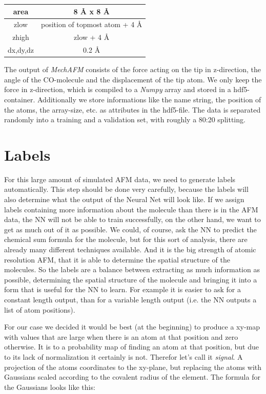 \documentclass{article}
\begin{document}
\begin{center}
\begin{tabular}{|c|c|}
\hline area & 8 {\AA} x 8 {\AA} \\ 
\hline zlow & position of topmost atom + 4 {\AA} \\ 
\hline zhigh & zlow + 4 {\AA} \\ 
\hline dx,dy,dz & 0.2 {\AA} \\ 
\hline 
\end{tabular} 
\end{center}

The output of \emph{MechAFM} consists of the force acting on the tip in z-direction, the angle of the CO-molecule and the displacement of the tip atom. We only keep the force in z-direction, which is compiled to a \emph{Numpy} array and stored in a hdf5-container. Additionally we store informations like the name string, the position of the atoms, the array-size, etc. as attributes in the hdf5-file. The data is separated randomly into a training and a validation set, with roughly a 80:20 splitting.


\newpage

\section{Labels}
For this large amount of simulated AFM data, we need to generate labels automatically. This step should be done very carefully, because the labels will also determine what the output of the Neural Net will look like. If we assign labels containing more information about the molecule than there is in the AFM data, the NN will not be able to train successfully, on the other hand, we want to get as much out of it as possible. We could, of course, ask the NN to predict the chemical sum formula for the molecule, but for this sort of analysis, there are already many different techniques available. And it is the big strength of atomic resolution AFM, that it is able to determine the spatial structure of the molecules. So the labels are a balance between extracting as much information as possible, determining the spatial structure of the molecule and bringing it into a form that is useful for the NN to learn. For example it is easier to ask for a constant length output, than for a variable length output (i.e. the NN outputs a list of atom positions).

For our case we decided it would be best (at the beginning) to produce a xy-map with values that are large when there is an atom at that position and zero otherwise. It is to a probability map of finding an atom at that position, but due to its lack of normalization it certainly is not. Therefor let's call it \emph{signal}.  A projection of the atoms coordinates to the xy-plane, but replacing the atoms with Gaussians scaled according to the covalent radius of the element. The formula for the Gaussians looks like this:
\end{document}

